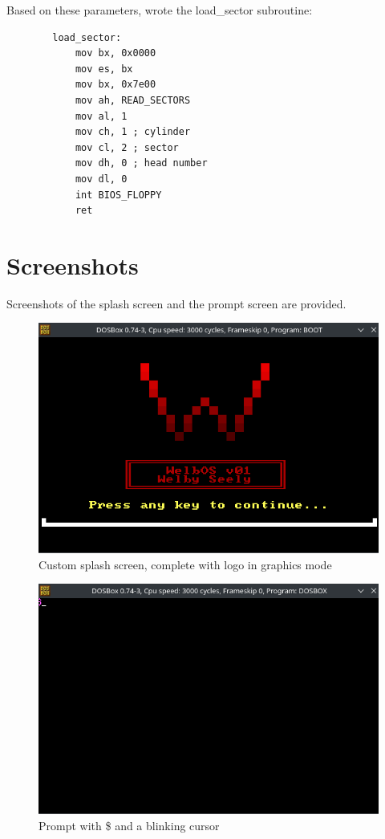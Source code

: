 \documentclass{article}
\begin{document}
    Based on these parameters, wrote the load\_sector subroutine:
    \begin{lstlisting}
        load_sector:
            mov bx, 0x0000
            mov es, bx
            mov bx, 0x7e00
            mov ah, READ_SECTORS
            mov al, 1
            mov ch, 1 ; cylinder
            mov cl, 2 ; sector
            mov dh, 0 ; head number
            mov dl, 0
            int BIOS_FLOPPY
            ret
    \end{lstlisting}

    \section{Screenshots}\label{sec:screenshots}
    Screenshots of the splash screen and the prompt screen are provided.

    \begin{figure}[H]  %
        \centering
        \includegraphics[width=\textwidth]{splash-screen} %
        \caption{Custom splash screen, complete with logo in graphics mode}
        \label{fig:1}
    \end{figure}

    \begin{figure}[H]  %
        \centering
        \includegraphics[width=\textwidth]{prompt} %
        \caption{Prompt with \$ and a blinking cursor}
        \label{fig:2}
    \end{figure}
\end{document}
